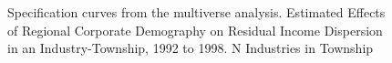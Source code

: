 \documentclass{article}
\begin{document}
\begin{figure}[htbp]
  \centering
  \caption{Specification curves from the multiverse analysis. Estimated Effects of Regional Corporate Demography on Residual Income Dispersion in an Industry-Township, 1992 to 1998.  N Industries in Township}
  \label{fig:gross_income}
  
\end{figure}


\clearpage %
\end{document}
